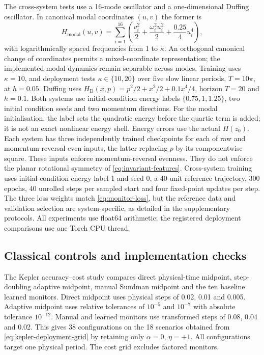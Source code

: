 \documentclass[final,3p,times]{elsarticle}
\begin{document}
The cross-system tests use a 16-mode oscillator and a one-dimensional
Duffing oscillator. In canonical modal coordinates $(u,v)$ the former is
\begin{equation}
 H_{\mathrm{modal}}(u,v)=\sum_{i=1}^{16}
 \left(\frac{v_i^2}{2}+\frac{\omega_i^2u_i^2}{2}
                  +\frac{0.25}{4}u_i^4\right),
 \label{eq:modal-benchmark}
\end{equation}
with logarithmically spaced frequencies from 1 to $\kappa$. An orthogonal
canonical change of coordinates permits a mixed-coordinate representation;
the implemented modal dynamics remain separable across modes. Training uses
$\kappa=10$, and deployment tests $\kappa\in\{10,20\}$ over five slow
linear periods, $T=10\pi$, at $h=0.05$. Duffing uses
$H_{\mathrm D}(x,p)=p^2/2+x^2/2+0.1x^4/4$, horizon $T=20$ and $h=0.1$.
Both systems use initial-condition energy labels $\{0.75,1,1.25\}$, two initial
condition seeds and two momentum directions. For the modal initialisation,
the label sets the quadratic energy before the quartic term is added; it
is not an exact nonlinear energy shell. Energy errors use the actual
$H(z_0)$. Each system has three independently trained checkpoints for
each of raw and momentum-reversal-even inputs, the latter replacing $p$
by its componentwise square. These inputs enforce momentum-reversal
evenness. They do not enforce the planar rotational symmetry of
\eqref{eq:invariant-features}. Cross-system training uses initial-condition
energy label 1 and seed 0, a 40-unit reference trajectory, 300 epochs,
40 unrolled steps per sampled start and four fixed-point updates per step.
The three loss weights match \eqref{eq:monitor-loss}, but the reference
data and validation selection are system-specific, as detailed in the
supplementary protocols. All experiments use float64 arithmetic;
the registered deployment comparisons use one Torch CPU thread.

\subsection{Classical controls and implementation checks}
\label{sec:controls-validation}
The Kepler accuracy--cost study compares direct physical-time midpoint,
step-doubling adaptive midpoint, manual Sundman midpoint and the ten
baseline learned monitors. Direct midpoint uses physical steps of
0.02, 0.01 and 0.005. Adaptive midpoint uses relative tolerances
of $10^{-5}$ and $10^{-7}$ with absolute tolerance $10^{-12}$.
Manual and learned monitors use transformed steps of 0.08, 0.04 and 0.02.
This gives 38
configurations on the 18 scenarios obtained from
\eqref{eq:kepler-deployment-grid} by retaining only $\alpha=0$, $\eta=+1$.
All configurations target one physical period. The cost grid excludes
factored monitors.
\end{document}
